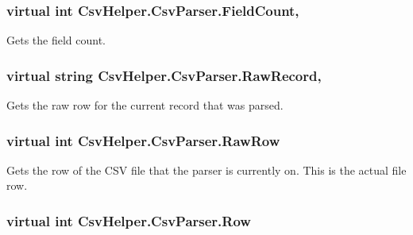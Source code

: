 \hypertarget{a00048_aa9cb95463f5328b8c85884f434975249}{
\subsubsection[{Field\-Count}]{\setlength{\rightskip}{0pt plus 5cm}virtual int Csv\-Helper.\-Csv\-Parser.\-Field\-Count\hspace{0.3cm}{\ttfamily [get]}, {\ttfamily [set]}}}\label{a00048_aa9cb95463f5328b8c85884f434975249}


Gets the field count. 

\hypertarget{a00048_ae2c14a3790234029587b817784bdd158}{
\subsubsection[{Raw\-Record}]{\setlength{\rightskip}{0pt plus 5cm}virtual string Csv\-Helper.\-Csv\-Parser.\-Raw\-Record\hspace{0.3cm}{\ttfamily [get]}, {\ttfamily [set]}}}\label{a00048_ae2c14a3790234029587b817784bdd158}


Gets the raw row for the current record that was parsed. 

\hypertarget{a00048_a87a7563b2835f1ccd09dbf0185b1b66c}{
\subsubsection[{Raw\-Row}]{\setlength{\rightskip}{0pt plus 5cm}virtual int Csv\-Helper.\-Csv\-Parser.\-Raw\-Row\hspace{0.3cm}{\ttfamily [get]}}}\label{a00048_a87a7563b2835f1ccd09dbf0185b1b66c}


Gets the row of the C\-S\-V file that the parser is currently on. This is the actual file row. 

\hypertarget{a00048_aae6f5e516189e2b2f9e80c33d235c7b4}{
\subsubsection[{Row}]{\setlength{\rightskip}{0pt plus 5cm}virtual int Csv\-Helper.\-Csv\-Parser.\-Row\hspace{0.3cm}{\ttfamily [get]}}}\label{a00048_aae6f5e516189e2b2f9e80c33d235c7b4}


